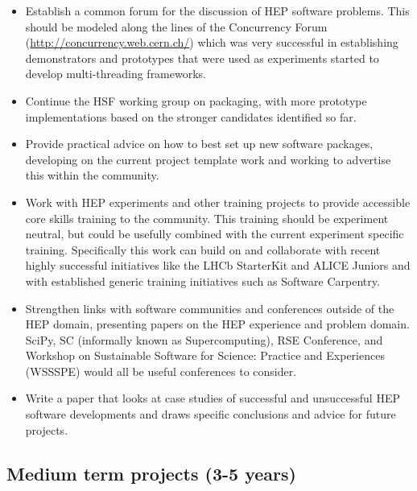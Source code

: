 \documentclass[12pt,a4paper]{article}
\begin{document}
\begin{itemize}
\item
    Establish a common forum for the discussion of HEP software problems.
  This should be modeled along the lines of the Concurrency Forum
  (\href{http://concurrency.web.cern.ch/}{{http://concurrency.web.cern.ch/}})
  which was very successful in establishing demonstrators and prototypes
  that were used as experiments started to develop multi-threading
  frameworks.
  \item
    Continue the HSF working group on packaging, with more prototype
  implementations based on the stronger candidates identified so far.
  \item
    Provide practical advice on how to best set up new software packages,
  developing on the current project template work and working to
  advertise this within the community.
  \item
    Work with HEP experiments and other training projects to provide
  accessible core skills training to the community. This training should
  be experiment neutral, but could be usefully combined with the current
  experiment specific training. Specifically this work can build on and
  collaborate with recent highly successful initiatives like the LHCb
  StarterKit and ALICE Juniors and with established generic training
  initiatives such as Software Carpentry.
  \item
    Strengthen links with software communities and conferences outside of
  the HEP domain, presenting papers on the HEP experience and problem
  domain. SciPy, SC (informally known as Supercomputing), RSE
  Conference, and Workshop on Sustainable Software for Science: Practice
  and Experiences (WSSSPE) would all be useful conferences to consider.
  \item
    Write a paper that looks at case studies of successful and
  unsuccessful HEP software developments and draws specific conclusions
  and advice for future projects.
  \end{itemize}

\hypertarget{medium-term-projects-3-5-years}{%
\subsection{Medium term projects (3-5
years)}\label{medium-term-projects-3-5-years}}
\end{document}
